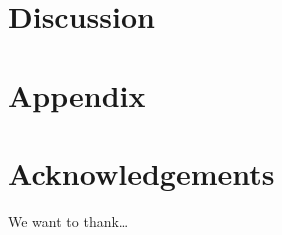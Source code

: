 \documentclass[submit]{smj}
\begin{document}
\section{Discussion}

\section{Appendix}
\section*{Acknowledgements}
We want to thank\ldots





%
%
%
%
%
%
\end{document}
